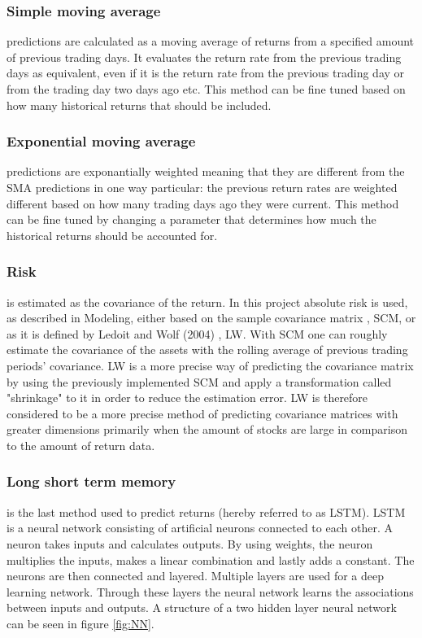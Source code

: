 \documentclass[final]{LTHtwocol} %
\begin{document}
\subsubsection{Simple moving average} predictions are calculated as a moving average of returns from a specified amount of previous trading days. It evaluates the return rate from the previous trading days as equivalent, even if it is the return rate from the previous trading day or from the trading day two days ago etc. This method can be fine tuned based on how many historical returns that should be included.
\cite{ref:SMAEMA}

\subsubsection{Exponential moving average} predictions are exponantially weighted meaning that they are different from the SMA predictions in one way particular: the previous return rates are weighted different based on how many trading days ago they were current. This method can be fine tuned by changing a parameter that determines how much the historical returns should be accounted for. \cite{ref:SMAEMA}

\subsubsection{Risk} is estimated as the covariance of the return. In this project absolute risk is used, as described in Modeling, either based on the sample covariance matrix \cite{covar}, SCM, or as it is defined by Ledoit and Wolf (2004) \cite{Ledoit_Wolf}, LW. With SCM one can roughly  estimate the covariance of the assets with the rolling average of previous trading periods' covariance. LW is a more precise way of predicting the covariance matrix by using the previously implemented SCM and apply a transformation called "shrinkage" to it in order to reduce the estimation error. LW is therefore considered to be a more precise method of predicting covariance matrices with greater dimensions primarily when the amount of stocks are large in comparison to the amount of return data. 

\subsubsection{Long short term memory}  is the last method used to predict returns (hereby referred to as LSTM). LSTM is a neural network consisting of artificial neurons connected to each other. A neuron takes inputs and calculates outputs. By using weights, the neuron multiplies the inputs, makes a linear combination and lastly adds a constant. The neurons are then connected and layered. Multiple layers are used for a deep learning network. Through these layers the neural network learns the associations between inputs and outputs. \cite{uppsala} A structure of a two hidden layer neural network can be seen in figure \ref{fig:NN}.
\end{document}
